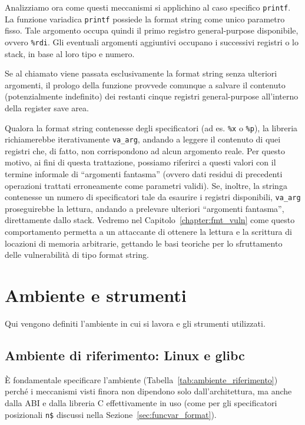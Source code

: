 Analizziamo ora come questi meccanismi si applichino al caso specifico \texttt{printf}. La funzione variadica \texttt{printf} possiede la format string come unico parametro fisso. Tale argomento occupa quindi il primo registro general-purpose disponibile, ovvero \texttt{\%rdi}. Gli eventuali argomenti aggiuntivi occupano i successivi registri o lo stack, in base al loro tipo e numero.

Se al chiamato viene passata esclusivamente la format string senza ulteriori argomenti, il prologo della funzione provvede comunque a salvare il contenuto (potenzialmente indefinito) dei restanti cinque registri general-purpose all'interno della register save area.

Qualora la format string contenesse degli specificatori (ad es. \texttt{\%x} o \texttt{\%p}), la libreria richiamerebbe iterativamente \texttt{va\_arg}, andando a leggere il contenuto di quei registri che, di fatto, non corrispondono ad alcun argomento reale. Per questo motivo, ai fini di questa trattazione, possiamo riferirci a questi valori con il termine informale di ``argomenti fantasma'' (ovvero dati residui di precedenti operazioni trattati erroneamente come parametri validi).
Se, inoltre, la stringa contenesse un numero di specificatori tale da esaurire i registri disponibili, \texttt{va\_arg} proseguirebbe la lettura, andando a prelevare ulteriori ``argomenti fantasma'', direttamente dallo stack.
Vedremo nel Capitolo~\ref{chapter:fmt_vuln} come questo comportamento permetta a un attaccante di ottenere la lettura e la scrittura di locazioni di memoria arbitrarie, gettando le basi teoriche per lo sfruttamento delle vulnerabilità di tipo format string.


\section{Ambiente e strumenti}\label{sec:env_tools}
Qui vengono definiti l'ambiente in cui si lavora e gli strumenti utilizzati.

\subsection{Ambiente di riferimento: Linux e glibc}\label{subsec:env}
È fondamentale specificare l'ambiente (Tabella~\ref{tab:ambiente_riferimento}) perché i meccanismi visti finora non dipendono solo dall'architettura, ma anche dalla ABI e dalla libreria C effettivamente in uso (come per gli specificatori posizionali \texttt{n\$} discussi nella Sezione~\ref{sec:funcvar_format}).

